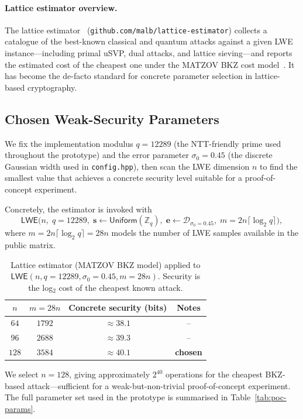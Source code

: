 \paragraph{Lattice estimator overview.}
The lattice estimator~\cite{EC:ADPS16} (\texttt{github.com/malb/lattice-estimator})
collects a catalogue of the best-known classical and quantum attacks against a given LWE
instance—including primal uSVP, dual attacks, and lattice sieving—and reports the
estimated cost of the cheapest one under the MATZOV BKZ cost model~\cite{MATZOV22}.
It has become the de-facto standard for concrete parameter selection in lattice-based
cryptography.

\subsection{Chosen Weak-Security Parameters}

We fix the implementation modulus $q=12289$ (the NTT-friendly prime used throughout the
prototype) and the error parameter $\sigma_0=0.45$ (the discrete Gaussian width used in
\texttt{config.hpp}), then scan the LWE dimension $n$ to find the smallest value that
achieves a concrete security level suitable for a proof-of-concept experiment.

Concretely, the estimator is invoked with
\[
    \mathsf{LWE}\bigl(n,\; q=12289,\;
    \mathbf{s}\leftarrow\mathsf{Uniform}(\mathbb{Z}_q),\;
    \mathbf{e}\leftarrow\mathcal{D}_{\sigma_0=0.45},\;
    m=2n\lceil\log_2 q\rceil\bigr),
\]
where $m=2n\lceil\log_2 q\rceil = 28n$ models the number of LWE samples available
in the public matrix.

\begin{table}[h]
\centering
\renewcommand{\arraystretch}{1.25}
\begin{tabular}{|c|c|c|c|}
\hline
$n$ & $m = 28n$ & Concrete security (bits) & Notes \\
\hline
$64$  & $1792$  & $\approx 38.1$ & -- \\
$96$  & $2688$  & $\approx 39.3$ & -- \\
$128$ & $3584$  & $\approx 40.1$ & \textbf{chosen} \\
\hline
\end{tabular}
\caption{Lattice estimator (MATZOV BKZ model) applied to $\mathsf{LWE}(n, q=12289, \sigma_0=0.45,
m=28n)$. Security is the log$_2$ cost of the cheapest known attack.}
\label{tab:param-scan}
\end{table}

We select $n=128$, giving approximately $2^{40}$ operations for the cheapest BKZ-based
attack—sufficient for a weak-but-non-trivial proof-of-concept experiment.
The full parameter set used in the prototype is summarised in Table~\ref{tab:poc-params}.

